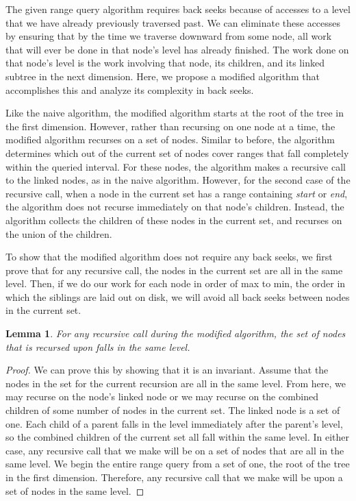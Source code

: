 \documentclass[11pt, oneside]{article}
\newcommand{\ms}{\textit}
\newtheorem*{lemma}{Lemma}
\begin{document}
The given range query algorithm requires back seeks because of accesses to a
level that we have already previously traversed past. We can eliminate these
accesses by ensuring that by the time we traverse downward from some node, all
work that will ever be done in that node's level has already finished. The work
done on that node's level is the work involving that node, its children, and
its linked subtree in the next dimension. Here, we propose a modified algorithm
that accomplishes this and analyze its complexity in back seeks.

Like the naive algorithm, the modified algorithm starts at the root of the tree
in the first dimension. However, rather than recursing on one node at a time,
the modified algorithm recurses on a set of nodes. Similar to before, the
algorithm determines which out of the current set of nodes cover ranges that
fall completely within the queried interval. For these nodes, the algorithm
makes a recursive call to the linked nodes, as in the naive algorithm. However,
for the second case of the recursive call, when a node in the current set has a
range containing \ms{start} or \ms{end}, the algorithm does not recurse
immediately on that node's children. Instead, the algorithm collects the
children of these nodes in the current set, and recurses on the union of the
children.

To show that the modified algorithm does not require any back seeks, we first
prove that for any recursive call, the nodes in the current set are all in the
same level. Then, if we do our work for each node in order of max to min, the
order in which the siblings are laid out on disk, we will avoid all back seeks
between nodes in the current set.

\begin{lemma}
    For any recursive call during the modified algorithm, the set of nodes that
    is recursed upon falls in the same level. 
\end{lemma}
\begin{proof}
    We can prove this by showing that it is an invariant. Assume that the nodes
    in the set for the current recursion are all in the same level. From here,
    we may recurse on the node's linked node or we may recurse on the combined
    children of some number of nodes in the current set. The linked node is a
    set of one. Each child of a parent falls in the level immediately after the
    parent's level, so the combined children of the current set all fall within
    the same level. In either case, any recursive call that we make will be on
    a set of nodes that are all in the same level. We begin the entire range
    query from a set of one, the root of the tree in the first dimension.
    Therefore, any recursive call that we make will be upon a set of nodes in
    the same level. 
\end{proof}
\end{document}
